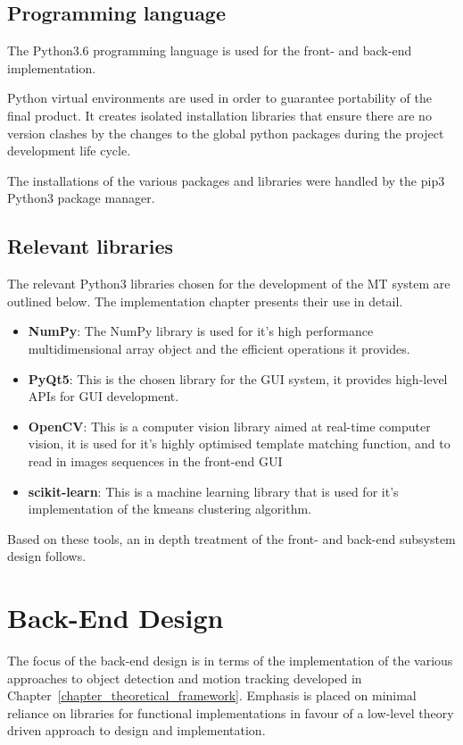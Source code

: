 \subsection{Programming language}
The Python3.6 programming language is used for the front- and
back-end implementation.

Python virtual environments are used in order to guarantee portability of the
final product. It creates isolated installation libraries that ensure there are
no version clashes by the changes to the global python packages during the
project development life cycle.

The installations of the various packages and libraries were handled by the pip3
Python3 package manager.

\subsection{Relevant libraries}
The relevant Python3 libraries chosen for the development of the MT system are
outlined below. The implementation chapter presents their use in detail.
\begin{itemize}
    \item \textbf{NumPy}: The NumPy library is used for it's high performance
        multidimensional array object and the efficient operations it provides.
    \item \textbf{PyQt5}: This is the chosen library for the GUI system, it
        provides high-level APIs for GUI development.     
    \item \textbf{OpenCV}: This is a computer vision library aimed at
        real-time computer vision, it is used for it's highly optimised template
        matching function, and to read in images sequences in the front-end GUI
    \item \textbf{scikit-learn}: This is a machine learning library that is
        used for it's implementation of the kmeans clustering algorithm.
\end{itemize}

Based on these tools, an in depth treatment of the front- and back-end subsystem
design follows. 

\section{Back-End Design}\label{design_back_end}
The focus of the back-end design is in terms of the implementation of the various
approaches to object detection and motion tracking developed in
Chapter~\ref{chapter_theoretical_framework}.
Emphasis is placed on minimal reliance on libraries for functional
implementations in favour of a low-level theory driven approach to design and
implementation.

